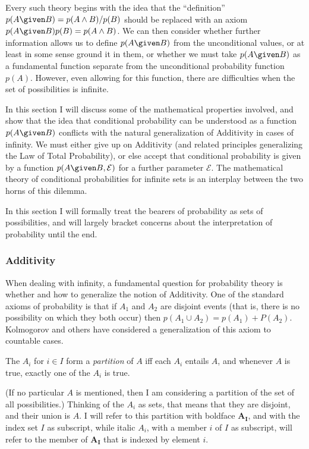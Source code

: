 Every such theory begins with the idea that the ``definition'' $p(A \given B)=p(A\land B)/p(B)$ should be replaced with an axiom $p(A \given B)p(B)=p(A\land B)$. We can then consider whether further information allows us to define $p(A \given B)$ from the unconditional values, or at least in some sense ground it in them, or whether we must take $p(A \given B)$ as a fundamental function separate from the unconditional probability function $p(A)$. However, even allowing for this function, there are difficulties when the set of possibilities is infinite.

In this section I will discuss some of the mathematical properties involved, and show that the idea that conditional probability can be understood as a function $p(A \given B)$ conflicts with the natural generalization of Additivity in cases of infinity. We must either give up on Additivity (and related principles generalizing the Law of Total Probability), or else accept that conditional probability is given by a function $p(A \given B,\mathcal{E})$ for a further parameter $\mathcal{E}$. The mathematical theory of conditional probabilities for infinite sets is an interplay between the two horns of this dilemma.

In this section I will formally treat the bearers of probability as sets of possibilities, and will largely bracket concerns about the interpretation of probability until the end.

\subsubsection{Additivity}

When dealing with infinity, a fundamental question for probability theory is whether and how to generalize the notion of Additivity. One of the standard axioms of probability is that if $A_1$ and $A_2$ are disjoint events (that is, there is no possibility on which they both occur) then $p(A_1\cup A_2)=p(A_1)+P(A_2)$. Kolmogorov and others have considered a generalization of this axiom to countable cases.

\begin{definition}The $A_i$ for $i\in I$ form a \emph{partition} of $A$ iff each $A_i$ entails $A$, and whenever $A$ is true, exactly one of the $A_i$ is true.\end{definition} (If no particular $A$ is mentioned, then I am considering a partition of the set of all possibilities.) Thinking of the $A_i$ as sets, that means that they are disjoint, and their union is $A$. I will refer to this partition with boldface $\mathbf{A_I}$, and with the index set $I$ as subscript, while italic $A_i$, with a member $i$ of $I$ as subscript, will refer to the member of $\mathbf{A_I}$ that is indexed by element $i$.

